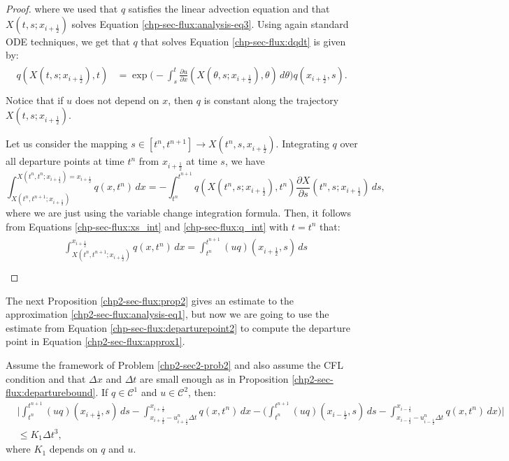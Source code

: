 \begin{proof}
where we used that $q$ satisfies the linear advection equation and that $X(t,s;x_{i+\frac{1}{2}})$
solves Equation \eqref{chp-sec-flux:analysis-eq3}.
Using again standard ODE techniques, we get that $q$ that solves Equation \eqref{chp-sec-flux:dqdt}
is given by:
\begin{align}
	\begin{split}
		\label{chp-sec-flux:q_int}
		q(X(t,s;x_{i+\frac{1}{2}}),t) &= 
		\exp{\bigg(- \int_{s}^{t} \frac{\partial u}{\partial x}(X(\theta,s;x_{i+\frac{1}{2}}),\theta)  \,d\theta \bigg)}
		q(x_{i+\frac{1}{2}},s).\\
	\end{split}
\end{align}
Notice that if $u$ does not depend on $x$, then $q$ is constant along the trajectory $X(t,s;x_{i+\frac{1}{2}})$.

Let us consider the mapping $s\in[t^n,t^{n+1}] \to X(t^n,s,x_{i+\frac{1}{2}})$. 
Integrating $q$ over all departure points at time $t^n$ from $x_{i+\frac{1}{2}}$ at time $s$, we have
\begin{equation}
	\label{chp-sec-flux:depint_1}
		\int^{X(t^n,t^{n};x_{i+\frac{1}{2}}) = x_{i+\frac{1}{2}}}_{X(t^n,t^{n+1};x_{i+\frac{1}{2}})} q(x,t^n)\,dx 
		=- \int_{t^n}^{t^{n+1}} q(X(t^n,s;x_{i+\frac{1}{2}}),t^n) \frac{\partial X}{\partial s} (t^n,s;x_{i+\frac{1}{2}})\,ds,
\end{equation}
where we are just using the variable change integration formula.
Then, it follows from Equations  \eqref{chp-sec-flux:xs_int}
and \eqref{chp-sec-flux:q_int} with $t=t^n$ that:
	\begin{align}
	\label{chp-sec-flux:depint_2}
	\begin{split}
		&\int_{X(t^n,t^{n+1};x_{i+\frac{1}{2}})}^{x_{i+\frac{1}{2}}} q(x,t^n)\,dx 
		= \int_{t^n}^{t^{n+1}} (uq)(x_{i+\frac{1}{2}},s) \,ds \\ 
	\end{split}
\end{align}
\end{proof}
The next Proposition \eqref{chp2-sec-flux:prop2} gives an estimate to the approximation \eqref{chp2-sec-flux:analysis-eq1},
but now we are going to use the estimate from Equation \eqref{chp-sec-flux:departurepoint2} to compute
the departure point in Equation \eqref{chp2-sec-flux:approx1}.
\begin{prop}
	\label{chp2-sec-flux:prop2}
	Assume the framework of Problem \ref{chp2-sec2-prob2} and also assume the CFL condition and 
	that $\Delta x$ and $ \Delta t $ are small enough as in Proposition \ref{chp2-sec-flux:departurebound}.
	If $q \in \mathcal{C}^1$  and $u \in \mathcal{C}^2$, then:
\begin{align*}
	&\bigg|\int_{t^n}^{t^{n+1}} (uq)(x_{i+\frac{1}{2}},s) \,ds 
	-\int^{x_{i+\frac{1}{2}}}_{x_{i+\frac{1}{2}}-u_{i+\frac{1}{2}}^n \Delta t} q(x,t^n)\,dx
	-\bigg( \int_{t^n}^{t^{n+1}} (uq)(x_{i-\frac{1}{2}},s) \,ds 
	-\int^{x_{i-\frac{1}{2}}}_{x_{i-\frac{1}{2}}-u_{i-\frac{1}{2}}^n \Delta t} q(x,t^n)\,dx  \bigg) \bigg| \\
	& \leq K_1 \Delta t^3,
\end{align*}
	where $K_1$ depends on $q$ and $u$.
\end{prop}
